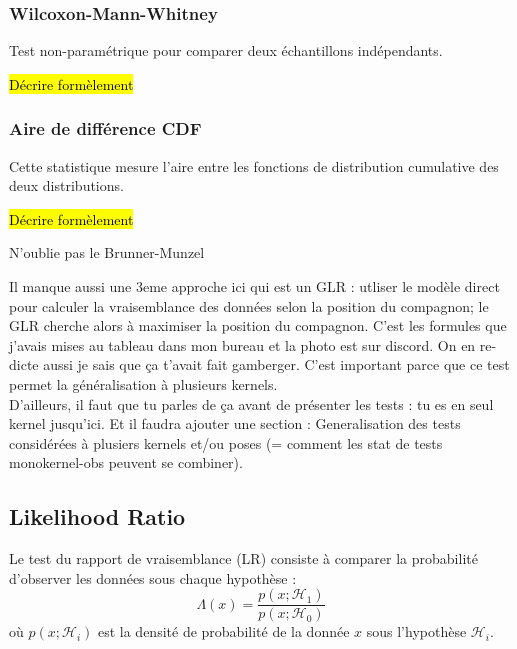 \documentclass{article}
\newcommand{\dm}[1]{{\color{mulberry} #1}}
\begin{document}
\subsubsection{Wilcoxon-Mann-Whitney}
Test non-paramétrique pour comparer deux échantillons indépendants.

\hl{Décrire formèlement}

\subsubsection{Aire de différence CDF}
Cette statistique mesure l'aire entre les fonctions de distribution cumulative des deux distributions.

\hl{Décrire formèlement}

\dm{N'oublie pas le Brunner-Munzel}

\dm{Il manque aussi une 3eme approche  ici qui est un GLR : utliser le modèle direct pour calculer la vraisemblance des données selon la position du compagnon; le GLR cherche alors à maximiser la position du compagnon. C'est les formules que j'avais mises au tableau dans mon bureau et la photo est sur discord. On en re-dicte aussi je sais que ça t'avait fait gamberger. C'est important parce que ce test permet la généralisation à plusieurs kernels. \\
D'ailleurs, il faut que tu parles de ça avant de présenter les tests : tu es en seul kernel jusqu'ici. Et il faudra ajouter  une section : Generalisation des tests considérées à plusiers kernels et/ou poses (= comment les stat de tests monokernel-obs peuvent se combiner).}

\subsection{Likelihood Ratio}
Le test du rapport de vraisemblance (LR) consiste à comparer la probabilité d'observer les données sous chaque hypothèse :
\begin{equation}
    \Lambda(x) = \frac{p(x;\mathcal{H}_1)}{p(x;\mathcal{H}_0)}
\end{equation}
où $p(x;\mathcal{H}_i)$ est la densité de probabilité de la donnée $x$ sous l'hypothèse $\mathcal{H}_i$.
\end{document}
